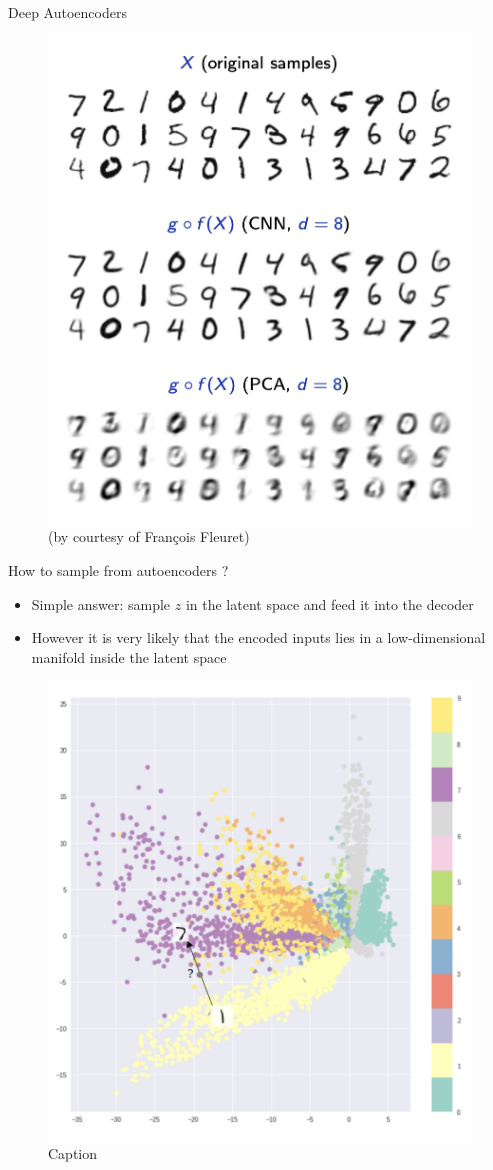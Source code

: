 \documentclass{beamer}
\begin{document}
\begin{frame}{Deep Autoencoders}
    \begin{figure}
        \centering
        \includegraphics[width=0.6\linewidth]{images/ae_cnn_vs_pca.png}
        \caption*{(by courtesy of François Fleuret)}
    \end{figure}
\end{frame}

\begin{frame}{How to sample from autoencoders ?}

\begin{itemize}
    \item Simple answer: sample $z$ in the latent space and feed it into the decoder
    \item However it is very likely that the encoded inputs lies in a low-dimensional manifold inside the latent space
\end{itemize}
\begin{figure}
    \centering
    \includegraphics[width=0.5\linewidth]{images/latent_ae.png}
    \caption{Caption}
    \label{fig:my_label}
\end{figure}
\end{frame}
\end{document}
